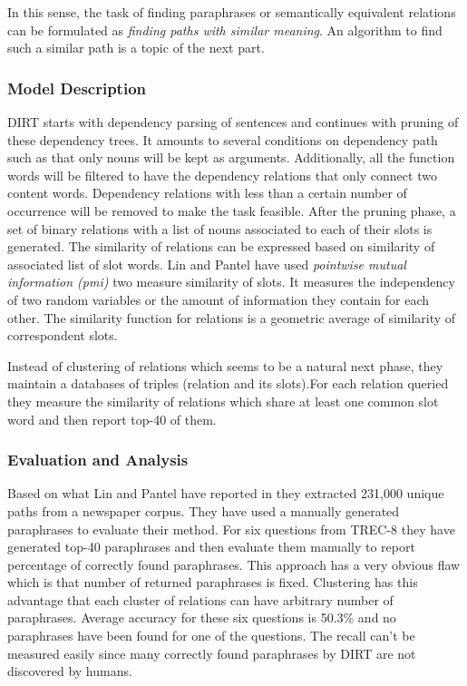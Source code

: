      
    In this sense, the task of finding paraphrases or semantically equivalent relations
     can be formulated as \emph{finding paths with similar meaning}. 
     An algorithm to find such a similar path is a topic of the next part.

\subsubsection{Model Description}
\label{ssec:dirt-model} 
DIRT starts with dependency parsing of sentences and continues with pruning of these dependency trees.
It amounts to several conditions on dependency path such as that only nouns will be kept as arguments. 
Additionally, all the function words will be filtered to have the dependency relations that only connect
two content words. Dependency relations with less than a certain number of occurrence will be removed to make the task feasible.
After the pruning phase, a set of binary relations with a list of nouns associated to each of their slots is generated. 
The similarity of relations can be expressed based on similarity of associated list of slot words. Lin and Pantel
have used \emph{pointwise mutual information (pmi)} two measure similarity of slots. 
It measures the independency of two random variables or the amount of
information they contain for each other. The similarity function for relations  is a geometric average
of similarity of correspondent slots.

Instead of clustering of relations which seems to be a natural next phase,
 they maintain a databases of triples (relation and its slots).For each relation queried
  they measure the similarity of relations which share at least one common slot word and then report top-40 of them.
  
\subsubsection{Evaluation and Analysis}
\label{ssec:dirt-model} 
  
  Based on what Lin and Pantel have reported in \cite{Lin2001} they extracted 231,000 unique paths from a newspaper corpus.
  They have used a manually generated paraphrases to evaluate their method. For six questions from TREC-8 
  they have generated top-40 paraphrases and then evaluate them manually to report percentage of correctly found paraphrases.
  This approach has a very obvious flaw which is that number of returned paraphrases is fixed. Clustering has this 
  advantage that each cluster of relations can have arbitrary number of paraphrases.
  Average accuracy for these six questions is 50.3\% and no paraphrases have been found for one of the questions.
  The recall can't be measured easily since many correctly found paraphrases by DIRT are not discovered by humans.
  
